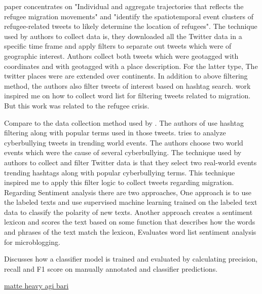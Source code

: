 \cite{Hübl} paper concentrates on "Individual and aggregate trajectories that reflects the refugee migration
movements" and "identify the spatiotemporal event clusters of refugee-related tweets to
likely determine the location of refugees". The technique used by authors to collect data is, they
downloaded all the Twitter data in a specific time frame and apply filters to separate out tweets
which were of geographic interest. Authors collect both tweets which were geotagged with coordinates
and with geotagged with a place description. For the latter type, The twitter places were
are extended over continents. In addition to above filtering method, the authors also filter tweets
of interest based on hashtag search. \cite{Hübl} work inspired me on how to collect word list for filtering
tweets related to migration. But this work was related to the refugee crisis.
 
Compare to the data collection method used by \cite{Hübl}. The authors of \cite{Cortis} use hashtag filtering
along with popular terms used in those tweets. \cite{Cortis} tries to analyze cyberbullying tweets in trending
world events. The authors choose two world events which were the cause of several cyberbullying.
The technique used by authors to collect and filter Twitter data is that they select two real-world
events trending hashtags along with popular cyberbullying terms. This technique inspired me to
apply this filter logic to collect tweets regarding migration.
Regarding Sentiment analysis there are two approaches, One approach is to use the labeled
texts and use supervised machine learning trained on the labeled text data to classify the polarity
of new texts. Another approach creates a sentiment lexicon and scores the text based on some
function that describes how the words and phrases of the text match the lexicon, \cite{DBLP} Evaluates
word list sentiment analysis for microblogging.

 \cite{Jamie} Discusses how a classifier model is trained
and evaluated by calculating precision, recall and F1 score on manually annotated and classifier
predictions.


 \underline{matte heavy agi bari}
